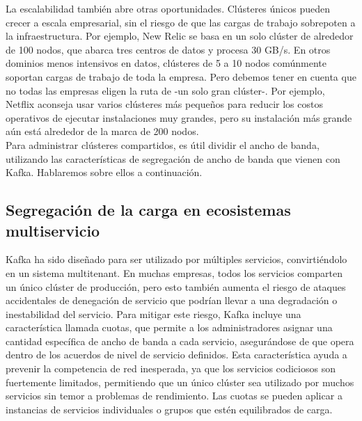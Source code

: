 \documentclass{article}
\begin{document}
La escalabilidad también abre otras oportunidades. Clústeres únicos pueden crecer a escala empresarial, sin el riesgo de que las cargas de trabajo sobrepoten a la infraestructura. Por ejemplo, New Relic se basa en un solo clúster de alrededor de 100 nodos, que abarca tres centros de datos y procesa 30 GB/s. En otros dominios menos intensivos en datos, clústeres de 5 a 10 nodos comúnmente soportan cargas de trabajo de toda la empresa. Pero debemos tener en cuenta que no todas las empresas eligen la ruta de -un solo gran clúster-. Por ejemplo, Netflix aconseja usar varios clústeres más pequeños para reducir los costos operativos de ejecutar instalaciones muy grandes, pero su instalación más grande aún está alrededor de la marca de 200 nodos.\\

Para administrar clústeres compartidos, es útil dividir el ancho de banda, utilizando las características de segregación de ancho de banda que vienen con Kafka. Hablaremos sobre ellos a continuación.

\subsection{Segregación de la carga en ecosistemas multiservicio}
Kafka ha sido diseñado para ser utilizado por múltiples servicios, convirtiéndolo en un sistema multitenant. En muchas empresas, todos los servicios comparten un único clúster de producción, pero esto también aumenta el riesgo de ataques accidentales de denegación de servicio que podrían llevar a una degradación o inestabilidad del servicio. Para mitigar este riesgo, Kafka incluye una característica llamada cuotas, que permite a los administradores asignar una cantidad específica de ancho de banda a cada servicio, asegurándose de que opera dentro de los acuerdos de nivel de servicio definidos. Esta característica ayuda a prevenir la competencia de red inesperada, ya que los servicios codiciosos son fuertemente limitados, permitiendo que un único clúster sea utilizado por muchos servicios sin temor a problemas de rendimiento. Las cuotas se pueden aplicar a instancias de servicios individuales o grupos que estén equilibrados de carga.
\end{document}
